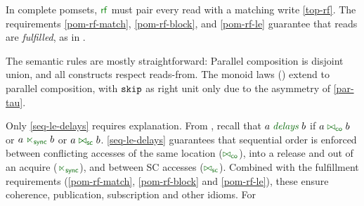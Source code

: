 In complete pomsets, $\rrfx$ must pair every read with a matching write
\eqref{top-rf}.  The requirements \ref{pom-rf-match}, \ref{pom-rf-block}, and
\ref{pom-rf-le} guarantee that reads are \emph{fulfilled}, as in
\cite[]{DBLP:journals/pacmpl/JagadeesanJR20}.

The semantic rules are mostly straightforward: Parallel composition is disjoint
union, and all constructs respect reads-from.  The monoid laws
() extend to parallel composition, with $\texttt{skip}$ as right
unit only due to the asymmetry of \ref{par-tau}.

Only \ref{seq-le-delays} requires explanation.
From , recall that $\aAct \rdelaysdef \bAct$ if
$\aAct\eqreorderco\bAct$ or $\aAct\reorderra\bAct$ or
$\aAct\eqreordersc\bAct$.  \ref{seq-le-delays} guarantees that sequential
order is enforced between conflicting accesses of the same location
($\eqreorderco$), into a release and out of an acquire ($\reorderra$), and
between SC accesses ($\eqreordersc$).  Combined with the fulfillment
requirements (\ref{pom-rf-match}, \ref{pom-rf-block} and \ref{pom-rf-le}),
these ensure coherence, publication, subscription and other idioms.  For
